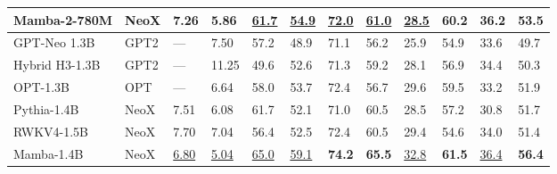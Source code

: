 \begin{table*}[ht]
{\begin{tabular}{@{}llllllllllll@{}}
      \textbf{Mamba-2-780M} & NeoX        & \textbf{7.26}              & \textbf{5.86}              & \underline{61.7}          & \underline{54.9}           & \underline{72.0}          & \underline{61.0}          & \underline{28.5}                      & \textbf{60.2}                           & \textbf{36.2}                           & \textbf{53.5} \\
      \midrule
      GPT-Neo 1.3B          & GPT2        & ---                        & 7.50                       & 57.2                      & 48.9                       & 71.1                      & 56.2                      & 25.9                                  & 54.9                                    & 33.6                                    & 49.7 \\
      Hybrid H3-1.3B        & GPT2        & ---                        & 11.25                      & 49.6                      & 52.6                       & 71.3                      & 59.2                      & 28.1                                  & 56.9                                    & 34.4                                    & 50.3 \\
      OPT-1.3B              & OPT         & ---                        & 6.64                       & 58.0                      & 53.7                       & 72.4                      & 56.7                      & 29.6                                  & 59.5                                    & 33.2                                    & 51.9 \\
      Pythia-1.4B           & NeoX        & 7.51                       & 6.08                       & 61.7                      & 52.1                       & 71.0                      & 60.5                      & 28.5                                  & 57.2                                    & 30.8                                    & 51.7 \\
      RWKV4-1.5B            & NeoX        & 7.70                       & 7.04                       & 56.4                      & 52.5                       & 72.4                      & 60.5                      & 29.4                                  & 54.6                                    & 34.0                                    & 51.4 \\
      Mamba-1.4B            & NeoX        & \underline{6.80}           & \underline{5.04}           & \underline{65.0}          & \underline{59.1}           & \textbf{74.2}             & \textbf{65.5}             & \underline{32.8}                      & \textbf{61.5}                           & \underline{36.4}                        & \textbf{56.4} \\

\end{tabular}}
\end{table*}

